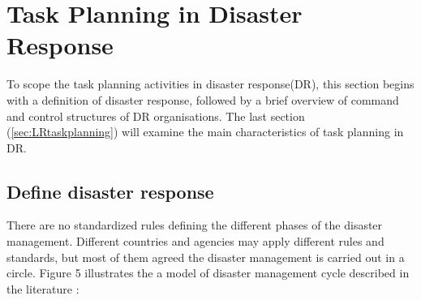 

\section{Task Planning in Disaster Response}\label{sec:lrplanning}
To scope the task planning activities in disaster response(DR), this section begins with a definition of disaster response, followed by a brief overview of command and control structures of DR organisations. The last section (\ref{sec:LRtaskplanning}) will examine the main characteristics of task planning in DR.\\

\subsection{Define disaster response}
There are no standardized rules defining the different phases of the disaster management. Different countries and agencies may apply different rules and standards, but most of them agreed the disaster management is carried out in a circle. Figure 5 illustrates the a model of disaster management cycle described in the literature \cite{Wattegama2012} :\\

